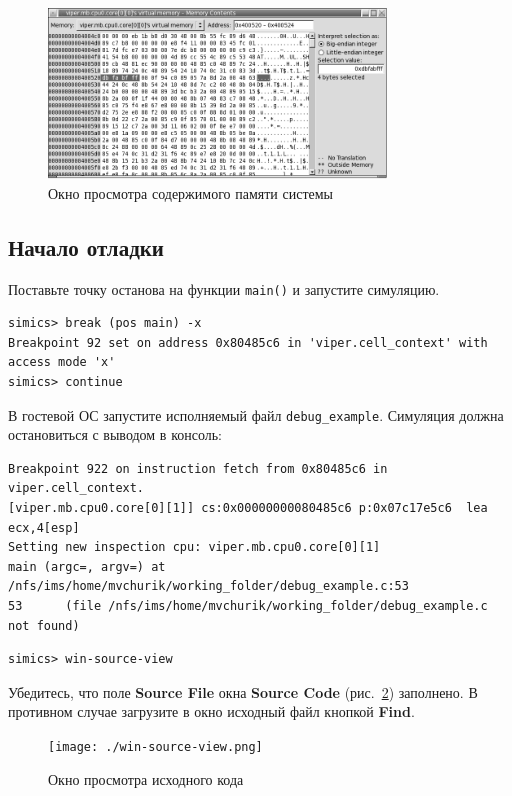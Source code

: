 \begin{figure}[htb]
    \centering
    \includegraphics[width=0.8\textwidth]{./images/win-memory.png}
    \caption{Окно просмотра содержимого памяти системы}
    \label{fig:win-memory}
\end{figure}

\subsection{Начало отладки}

Поставьте точку останова на функции \texttt{main()} и запустите симуляцию.
\begin{lstlisting}
simics> break (pos main) -x
Breakpoint 92 set on address 0x80485c6 in 'viper.cell_context' with access mode 'x'
simics> continue
\end{lstlisting}

В гостевой ОС запустите исполняемый файл \texttt{debug_example}. Симуляция должна остановиться с выводом в консоль:
\begin{lstlisting}
Breakpoint 922 on instruction fetch from 0x80485c6 in viper.cell_context.
[viper.mb.cpu0.core[0][1]] cs:0x00000000080485c6 p:0x07c17e5c6  lea ecx,4[esp]
Setting new inspection cpu: viper.mb.cpu0.core[0][1]
main (argc=, argv=) at /nfs/ims/home/mvchurik/working_folder/debug_example.c:53
53      (file /nfs/ims/home/mvchurik/working_folder/debug_example.c not found)
\end{lstlisting}

\begin{lstlisting}
simics> win-source-view
\end{lstlisting}
Убедитесь, что поле \textbf{Source File}  окна \textbf{Source Code} (рис.~\ref{fig:win-source-view}) заполнено. В противном случае загрузите в окно исходный файл кнопкой \textbf{Find}.

\begin{figure}[htb]
    \centering
    \texttt{[image: ./win-source-view.png]}
    \caption{Окно просмотра исходного кода}
    \label{fig:win-source-view}
\end{figure}

